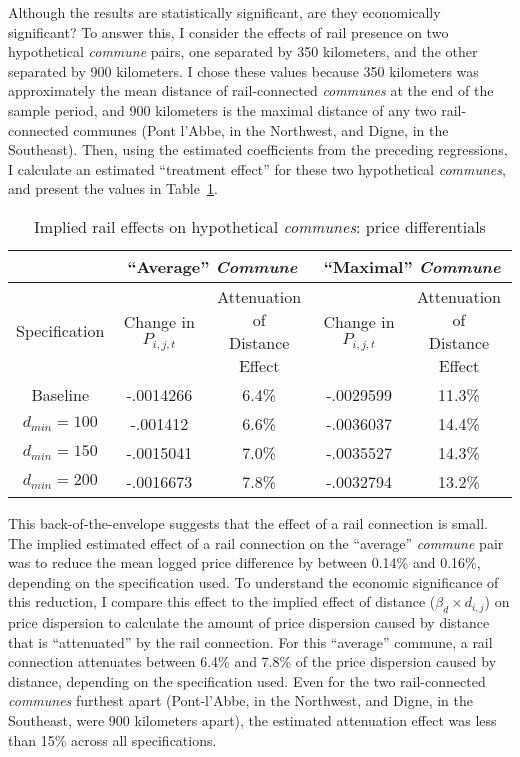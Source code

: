 \documentclass[12pt,twoside]{article}
\begin{document}
Although the results are statistically significant, are they economically significant?
To answer this, I consider the effects of rail presence on two hypothetical \emph{commune} pairs, one separated by 350 kilometers, and the other separated by 900 kilometers.
I chose these values because 350 kilometers was approximately the mean distance of rail-connected \emph{communes} at the end of the sample period, and 900 kilometers is the maximal distance of any two rail-connected communes (Pont l'Abbe, in the Northwest, and Digne, in the Southeast).
Then, using the estimated coefficients from the preceding regressions, I calculate an estimated ``treatment effect'' for these two hypothetical \emph{communes}, and present the values in Table~\ref{tab:treatment1}.

\begin{table}[ht]
	\centering \caption{Implied rail effects on hypothetical \emph{communes}: price differentials} \label{tab:treatment1}
	\begin{centering}
	\begin{tabular}{ |c|c|c|c|c| }
		\hline & \multicolumn{2}{c|}{``Average'' \emph{Commune}} & \multicolumn{2}{c|}{``Maximal'' \emph{Commune}} \\ \hline
		Specification & \shortstack{Change in \\ $P_{i,j,t}$} & \shortstack{Attenuation of \\ Distance Effect} & \shortstack{Change in \\ $P_{i,j,t}$} & \shortstack{Attenuation of \\ Distance Effect} \\ \hline
		Baseline & -.0014266 & 6.4\% & -.0029599 & 11.3\% \\
		$d_{min} = 100$ & -.001412 & 6.6\% & -.0036037 & 14.4\% \\
		$d_{min} = 150$ & -.0015041 & 7.0\% & -.0035527 & 14.3\% \\
		$d_{min} = 200$ & -.0016673 & 7.8\% & -.0032794 & 13.2\% \\ \hline
	\end{tabular}
	\end{centering}
\end{table}

This back-of-the-envelope suggests that the effect of a rail connection is small.
The implied estimated effect of a rail connection on the ``average'' \emph{commune} pair was to reduce the mean logged price difference by between 0.14\% and 0.16\%, depending on the specification used.
To understand the economic significance of this reduction, I compare this effect to the implied effect of distance ($\beta_d \times d_{i,j}$) on price dispersion to calculate the amount of price dispersion caused by distance that is ``attenuated'' by the rail connection.
For this ``average'' commune, a rail connection attenuates between 6.4\% and 7.8\% of the price dispersion caused by distance, depending on the specification used.
Even for the two rail-connected \emph{communes} furthest apart (Pont-l'Abbe, in the Northwest, and Digne, in the Southeast, were 900 kilometers apart), the estimated attenuation effect was less than 15\% across all specifications.
\end{document}
